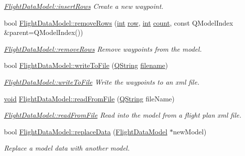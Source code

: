 \begin{DoxyCompactItemize}
\begin{DoxyCompactList}\small\item\em \hyperlink{group___path_ga17a5cd58322554d7fadb0c84031deb26}{Flight\-Data\-Model\-::insert\-Rows} Create a new waypoint. \end{DoxyCompactList}\item 
bool \hyperlink{group___path_ga951208986321a56cc67eafa5a9d67f0e}{Flight\-Data\-Model\-::remove\-Rows} (\hyperlink{ioapi_8h_a787fa3cf048117ba7123753c1e74fcd6}{int} \hyperlink{glext_8h_a11b277b422822f784ee248b43eee3e1e}{row}, \hyperlink{ioapi_8h_a787fa3cf048117ba7123753c1e74fcd6}{int} \hyperlink{glext_8h_a5b40aca7a9682963dd00a8f5aef0a901}{count}, const Q\-Model\-Index \&parent=Q\-Model\-Index())
\begin{DoxyCompactList}\small\item\em \hyperlink{group___path_ga951208986321a56cc67eafa5a9d67f0e}{Flight\-Data\-Model\-::remove\-Rows} Remove waypoints from the model. \end{DoxyCompactList}\item 
bool \hyperlink{group___path_gae8b76411094a9ad3164eab0996436da6}{Flight\-Data\-Model\-::write\-To\-File} (\hyperlink{group___u_a_v_objects_plugin_gab9d252f49c333c94a72f97ce3105a32d}{Q\-String} \hyperlink{ioapi_8h_a7a03a664b090ce5c848ecb31cb4a2fa8}{filename})
\begin{DoxyCompactList}\small\item\em \hyperlink{group___path_gae8b76411094a9ad3164eab0996436da6}{Flight\-Data\-Model\-::write\-To\-File} Write the waypoints to an xml file. \end{DoxyCompactList}\item 
\hyperlink{group___u_a_v_objects_plugin_ga444cf2ff3f0ecbe028adce838d373f5c}{void} \hyperlink{group___path_ga39997b5fd9d9720f2798e2c1a18b8171}{Flight\-Data\-Model\-::read\-From\-File} (\hyperlink{group___u_a_v_objects_plugin_gab9d252f49c333c94a72f97ce3105a32d}{Q\-String} file\-Name)
\begin{DoxyCompactList}\small\item\em \hyperlink{group___path_ga39997b5fd9d9720f2798e2c1a18b8171}{Flight\-Data\-Model\-::read\-From\-File} Read into the model from a flight plan xml file. \end{DoxyCompactList}\item 
bool \hyperlink{group___path_ga59cab53123301865b4604e97e13e1ce0}{Flight\-Data\-Model\-::replace\-Data} (\hyperlink{class_flight_data_model}{Flight\-Data\-Model} $\ast$new\-Model)
\begin{DoxyCompactList}\small\item\em Replace a model data with another model. \end{DoxyCompactList}\item 

\end{DoxyCompactItemize}
